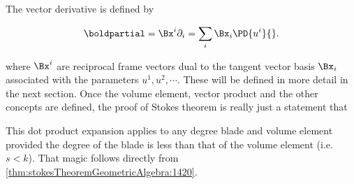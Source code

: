 %
%

The vector derivative is defined by

\begin{equation}\label{eqn:stokesTheoremGeometricAlgebra:1400}
\boldpartial = \Bx^i \partial_i = \sum_i \Bx_i \PD{u^i}{}.
\end{equation}

where \( \Bx^i \) are reciprocal frame vectors dual to the tangent vector basis \( \Bx_i \) associated with the parameters \( u^1, u^2, \cdots \).  These will be defined in more detail in the next section.  Once the volume element, vector product and the other concepts are defined, the proof of
Stokes theorem is really just a statement that


This dot product expansion applies to any degree blade and volume element provided the degree of the blade is less than that of the volume element (i.e. \(s < k\)).  That magic follows directly from \cref{thm:stokesTheoremGeometricAlgebra:1420}.
